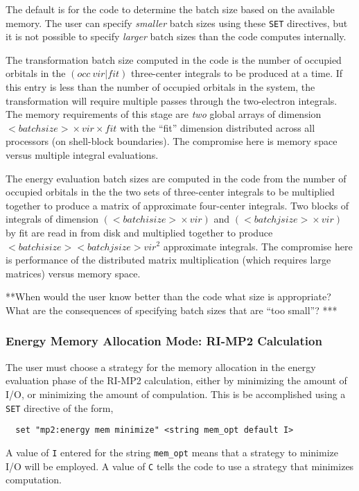 The default is for the code to determine the batch size based on the 
available memory.  The user can specify {\em smaller} batch sizes using
these \verb+SET+ directives, but it is not possible to specify {\em larger}
batch sizes than the code computes internally.

The transformation batch size computed in the code is the number of 
occupied orbitals in the
$({occ}\ {vir} | {fit})$ three-center integrals to
be produced at a time.  If this entry is less than the number of occupied
orbitals in the system, the transformation will require multiple
passes through the two-electron integrals.  The memory requirements of
this stage are {\em two} global arrays of dimension ${<batch
size>}\times {vir} \times {fit}$ with the ``fit''
dimension distributed across all processors (on shell-block
boundaries).  The compromise here is memory space versus multiple
integral evaluations.

The energy evaluation batch sizes are computed in the code from the 
number of occupied orbitals in
the the two sets of three-center integrals to be multiplied together
to produce a matrix of approximate four-center integrals.  Two blocks
of integrals of dimension $({<batch isize>}\times {vir})$ and
$({<batch jsize>}\times {vir})$ by fit are read in from disk and
multiplied together to produce $<batch isize> <batch jsize> {vir}^2$
approximate integrals.  The compromise here is performance of the
distributed matrix multiplication (which requires large matrices)
versus memory space.

\Large
**When would the user know better than the code what size is appropriate?
What are the consequences of specifying batch sizes that are ``too small''?
***
\normalsize

\subsubsection{Energy Memory Allocation Mode: RI-MP2 Calculation}

The user must choose a  strategy for the memory allocation in the energy
evaluation phase of the RI-MP2 calculation, either by minimizing the amount
of I/O, or minimizing the amount of compulation.  This is be accomplished 
using a \verb+SET+ directive of the form,

\begin{verbatim}
  set "mp2:energy mem minimize" <string mem_opt default I>
\end{verbatim}

A value of \verb+I+ entered for the string \verb+mem_opt+ means that
a strategy to minimize I/O will be employed.  A value of \verb+C+ tells
the code to use a strategy that minimizes computation.

